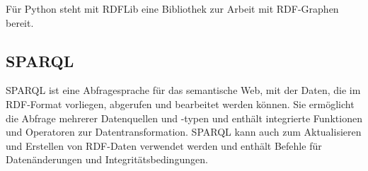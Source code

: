 Für Python steht mit RDFLib \cite{rdflib_team_rdflib_2022} eine Bibliothek zur Arbeit mit RDF-Graphen bereit.

\subsection{SPARQL}
\ac{SPARQL} ist eine Abfragesprache für das semantische Web, mit der Daten, die im RDF-Format vorliegen, abgerufen und bearbeitet werden können. Sie ermöglicht die Abfrage mehrerer Datenquellen und -typen und enthält integrierte Funktionen und Operatoren zur Datentransformation. SPARQL kann auch zum Aktualisieren und Erstellen von RDF-Daten verwendet werden und enthält Befehle für Datenänderungen und Integritätsbedingungen. 
